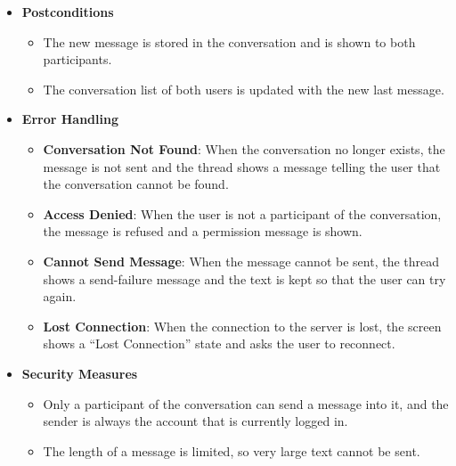 \begin{itemize}[leftmargin=1.6em,topsep=4pt,itemsep=3pt,parsep=0pt,label=$\bullet$]
        \begin{itemize}[leftmargin=2.2em,topsep=2pt,itemsep=3pt,parsep=0pt,label=$\circ$]
            \item \textbf{Enter Key}: When the user presses the Enter key without holding Shift, the message is sent in the same way as clicking the send button.
            \item \textbf{Empty Message}: When the input box is empty, the send button remains disabled and the user cannot send an empty message.
            \item \textbf{Emoji Only}: When the message contains only emojis, the message is displayed with a larger font in the thread.
        \end{itemize}
    \item \textbf{Postconditions}

        \begin{itemize}[leftmargin=2.2em,topsep=2pt,itemsep=3pt,parsep=0pt,label=$\circ$]
            \item The new message is stored in the conversation and is shown to both participants.
            \item The conversation list of both users is updated with the new last message.
        \end{itemize}
    \item \textbf{Error Handling}

        \begin{itemize}[leftmargin=2.2em,topsep=2pt,itemsep=3pt,parsep=0pt,label=$\circ$]
            \item \textbf{Conversation Not Found}: When the conversation no longer exists, the message is not sent and the thread shows a message telling the user that the conversation cannot be found.
            \item \textbf{Access Denied}: When the user is not a participant of the conversation, the message is refused and a permission message is shown.
            \item \textbf{Cannot Send Message}: When the message cannot be sent, the thread shows a send-failure message and the text is kept so that the user can try again.
            \item \textbf{Lost Connection}: When the connection to the server is lost, the screen shows a ``Lost Connection'' state and asks the user to reconnect.
        \end{itemize}
    \item \textbf{Security Measures}

        \begin{itemize}[leftmargin=2.2em,topsep=2pt,itemsep=3pt,parsep=0pt,label=$\circ$]
            \item Only a participant of the conversation can send a message into it, and the sender is always the account that is currently logged in.
            \item The length of a message is limited, so very large text cannot be sent.
        \end{itemize}
\end{itemize}

